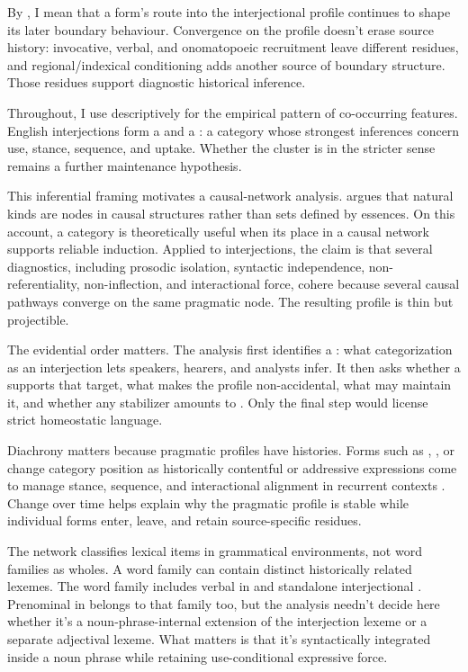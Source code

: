 \documentclass[12pt]{article}
\begin{document}
By , I mean that a form's route into the
interjectional profile continues to shape its later boundary behaviour.
Convergence on the profile doesn't erase source history: invocative,
verbal, and onomatopoeic recruitment leave different residues, and
regional/indexical conditioning adds another source of boundary
structure. Those residues support diagnostic historical inference.

Throughout, I use  descriptively for the
empirical pattern of co-occurring features. English interjections form a
 and a : a
category whose strongest inferences concern use, stance, sequence, and
uptake. Whether the cluster is  in the stricter sense
remains a further maintenance hypothesis.

This inferential framing motivates a causal-network analysis.
\textcite{khalidi2013,khalidi2018nodes} argues that natural kinds are
nodes in causal structures rather than sets defined by essences. On
this account, a category is theoretically useful when its place in a
causal network supports reliable induction. Applied to interjections,
the claim is that several diagnostics, including prosodic isolation,
syntactic independence, non-referentiality, non-inflection, and
interactional force, cohere because several causal pathways converge on
the same pragmatic node. The resulting profile is thin but projectible.

The evidential order matters. The analysis first identifies a
: what categorization as an interjection lets
speakers, hearers, and analysts infer. It then asks whether a
 supports that target, what 
makes the profile non-accidental, what  may maintain
it, and whether any stabilizer amounts to .
Only the final step would license strict homeostatic language.

Diachrony matters because pragmatic profiles have histories. Forms such
as , , or  change category
position as historically contentful or addressive expressions come to
manage stance, sequence, and interactional alignment in recurrent
contexts \citep[cf.][]{juckertaavitsainen2013}. Change over time helps
explain why the pragmatic profile is stable while individual forms enter,
leave, and retain source-specific residues.

The network classifies lexical items in grammatical environments, not
word families as wholes. A word family can contain distinct historically
related lexemes. The  word family includes verbal
 in  and standalone interjectional
. Prenominal  in 
belongs to that family too, but the analysis needn't decide here whether
it's a noun-phrase-internal extension of the interjection lexeme or a
separate adjectival lexeme. What matters is that it's syntactically
integrated inside a noun phrase while retaining use-conditional
expressive force.
\end{document}
